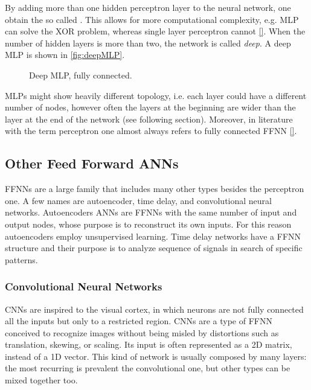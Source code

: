 By adding more than one hidden perceptron layer to the neural network, one obtain the so called .
This allows for more computational complexity, e.g. \acs{MLP} can solve the \acs{XOR} problem, whereas single layer perceptron cannot \ref{}.
When the number of hidden layers is more than two, the network is called \textit{deep}.
A deep \acs{MLP} is shown in \autoref{fig:deepMLP}.

\begin{figure}[ht]
	\centering
	
	\caption{	Deep \acf{MLP}, fully connected.}
	\label{fig:deepMLP}
\end{figure}

\acsp{MLP} might show heavily different topology, i.e. each layer could have a different number of nodes, however often the layers at the beginning are wider than the layer at the end of the network (see following section).
Moreover, in literature with the term perceptron one almost always refers to fully connected \acs{FFNN} \ref{}.

\subsection{Other Feed Forward \acsp{ANN}}
\label{ssec:Other_Feed_Forward_NNs}

\acsp{FFNN} are a large family that includes many other types besides the perceptron one.
A few names are autoencoder, time delay, and convolutional neural networks.
Autoencoders \acsp{ANN} are \acsp{FFNN} with the same number of input and output nodes, whose purpose is to reconstruct its own inputs.
For this reason autoencoders employ unsupervised learning.
Time delay networks have a \acs{FFNN} structure and their purpose is to analyze sequence of signals in search of specific patterns.

\subsubsection{Convolutional Neural Networks}
\label{par:Convolutional}
\acp{CNN} are inspired to the visual cortex, in which neurons are not fully connected all the inputs but only to a restricted region.
\aclp{CNN} are a type of \acs{FFNN} conceived to recognize images without being misled by distortions such as translation, skewing, or scaling.
Its input is often represented as a 2D matrix, instead of a 1D vector.
This kind of network is usually composed by many layers: the most recurring is prevalent the convolutional one, but other types can be mixed together too.

